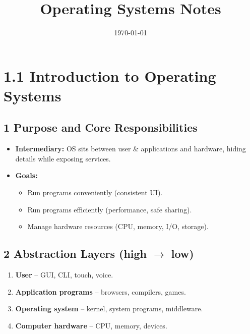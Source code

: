\documentclass{article}
\title{Operating Systems Notes}
\author{} %
\date{\today}
\begin{document}
\linespread{1.0}\selectfont %
\maketitle
\tableofcontents
\newpage
\linespread{0.8}\selectfont %
\section*{1.1 Introduction to Operating Systems}
\subsection*{1 Purpose and Core Responsibilities}
\begin{itemize}
    \item \textbf{Intermediary:} OS sits between user \& applications and hardware, hiding details while exposing services.
    \item \textbf{Goals:}
    \begin{itemize}
        \item Run programs conveniently (consistent UI).
        \item Run programs efficiently (performance, safe sharing).
        \item Manage hardware resources (CPU, memory, I/O, storage).
    \end{itemize}
\end{itemize}

\subsection*{2 Abstraction Layers (high $\rightarrow$ low)}
\begin{enumerate}[label=\arabic*.]
    \item \textbf{User} – GUI, CLI, touch, voice.
    \item \textbf{Application programs} – browsers, compilers, games.
    \item \textbf{Operating system} – kernel, system programs, middleware.
    \item \textbf{Computer hardware} – CPU, memory, devices.
\end{enumerate}
\end{document}
